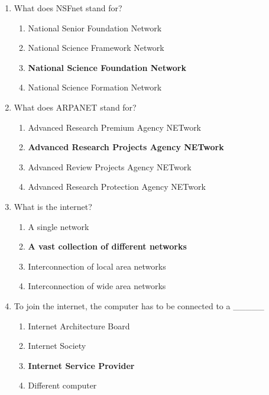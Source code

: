 \documentclass{article}
\begin{document}
\begin{enumerate}[label=\arabic*.]
    \item What does NSFnet stand for?
          \begin{enumerate}
              \item National Senior Foundation Network
              \item National Science Framework Network
              \item \textbf{National Science Foundation Network}
              \item National Science Formation Network
          \end{enumerate}

    \item What does ARPANET stand for?
          \begin{enumerate}
              \item Advanced Research Premium Agency NETwork
              \item \textbf{Advanced Research Projects Agency NETwork}
              \item Advanced Review Projects Agency NETwork
              \item Advanced Research Protection Agency NETwork
          \end{enumerate}

    \item What is the internet?
          \begin{enumerate}
              \item A single network
              \item \textbf{A vast collection of different networks}
              \item Interconnection of local area networks
              \item Interconnection of wide area networks
          \end{enumerate}

    \item To join the internet, the computer has to be connected to a \_\_\_\_\_
          \begin{enumerate}
              \item Internet Architecture Board
              \item Internet Society
              \item \textbf{Internet Service Provider}
              \item Different computer
          \end{enumerate}


\end{enumerate}
\end{document}
